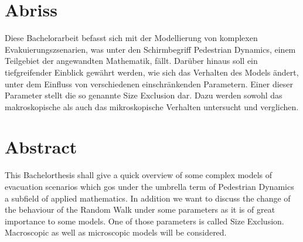 \section*{Abriss}
Diese Bachelorarbeit befasst sich mit der Modellierung von komplexen Evakuierungszsenarien,
was unter den Schirmbegriff Pedestrian Dynamics, einem Teilgebiet der angewandten Mathematik, fällt.
Darüber hinaus soll ein tiefgreifender Einblick gewährt werden, wie sich das Verhalten des Models ändert, 
unter dem Einfluss von verschiedenen einschränkenden Parametern. Einer dieser Parameter stellt die so genannte Size Exclusion dar. 
Dazu werden sowohl das makroskopische als auch das mikroskopische Verhalten untersucht und verglichen. 

\vspace{1.5cm}
\section*{Abstract}
This Bachelorthesis shall give a quick overview of some complex models of evacuation scenarios
which gos under the umbrella term of Pedestrian Dynamics a subfield of applied mathematics. 
In addition we want to discuss the change of the behaviour of the Random Walk under some parameters 
as it is of great importance to some models. One of those parameters is called Size Exclusion. 
Macroscopic as well as microscopic models will be considered. 
